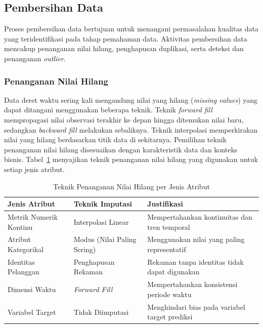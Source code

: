 \subsection{Pembersihan Data}
\label{subsec:pembersihan-data}

Proses pembersihan data bertujuan untuk menangani permasalahan kualitas data yang teridentifikasi pada tahap pemahaman data. Aktivitas pembersihan data mencakup penanganan nilai hilang, penghapusan duplikasi, serta deteksi dan penanganan \textit{outlier}.

\subsubsection{Penanganan Nilai Hilang}

Data deret waktu sering kali mengandung nilai yang hilang (\textit{missing values}) yang dapat ditangani menggunakan beberapa teknik. Teknik \textit{forward fill} mempropagasi nilai observasi terakhir ke depan hingga ditemukan nilai baru, sedangkan \textit{backward fill} melakukan sebaliknya. Teknik interpolasi memperkirakan nilai yang hilang berdasarkan titik data di sekitarnya. Pemilihan teknik penanganan nilai hilang disesuaikan dengan karakteristik data dan konteks bisnis. Tabel~\ref{tab:teknik-missing} menyajikan teknik penanganan nilai hilang yang digunakan untuk setiap jenis atribut.

\begin{table}[htbp]
\centering
\caption{Teknik Penanganan Nilai Hilang per Jenis Atribut}
\label{tab:teknik-missing}
\begin{tabular}{|p{3.5cm}|p{3.5cm}|p{5.5cm}|}
\hline
\textbf{Jenis Atribut} & \textbf{Teknik Imputasi} & \textbf{Justifikasi} \\
\hline
Metrik Numerik Kontinu & Interpolasi Linear & Mempertahankan kontinuitas dan tren temporal \\
\hline
Atribut Kategorikal & Modus (Nilai Paling Sering) & Menggunakan nilai yang paling representatif \\
\hline
Identitas Pelanggan & Penghapusan Rekaman & Rekaman tanpa identitas tidak dapat digunakan \\
\hline
Dimensi Waktu & \textit{Forward Fill} & Mempertahankan konsistensi periode waktu \\
\hline
Variabel Target & Tidak Diimputasi & Menghindari bias pada variabel target prediksi \\
\hline
\end{tabular}
\end{table}

